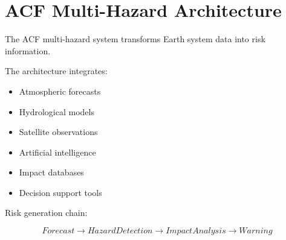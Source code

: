 \section{ACF Multi-Hazard Architecture}


The ACF multi-hazard system transforms Earth system data into
risk information.



The architecture integrates:


\begin{itemize}

\item Atmospheric forecasts

\item Hydrological models

\item Satellite observations

\item Artificial intelligence

\item Impact databases

\item Decision support tools

\end{itemize}



Risk generation chain:


\begin{equation}
Forecast
\rightarrow
Hazard Detection
\rightarrow
Impact Analysis
\rightarrow
Warning
\end{equation}


